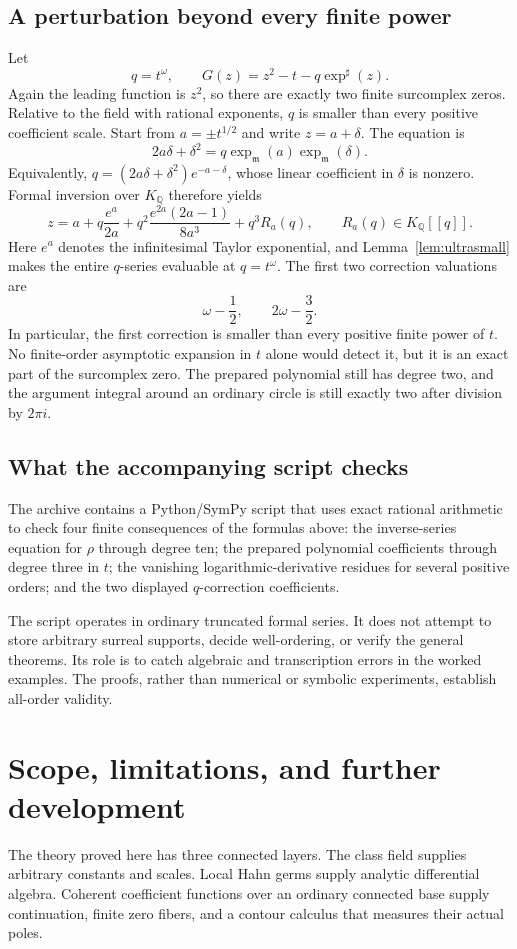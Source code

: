 \documentclass[11pt,a4paper]{article}
\theoremstyle{definition}
\theoremstyle{remark}
\newcommand{\Q}{\mathbb Q}
\newcommand{\mm}{\mathfrak m}
\begin{document}
\subsection{A perturbation beyond every finite power}
Let
\[
 q=t^\omega,\qquad G(z)=z^2-t-q\exp^\sharp(z).
\]
Again the leading function is $z^2$, so there are exactly two finite
surcomplex zeros. Relative to the field with rational exponents,
$q$ is smaller than every positive coefficient scale. Start from
$a=\pm t^{1/2}$ and write $z=a+\delta$. The equation is
\[
 2a\delta+\delta^2=q\exp_{\mm}(a)\exp_{\mm}(\delta).
\]
Equivalently, $q=(2a\delta+\delta^2)e^{-a-\delta}$, whose
linear coefficient in $\delta$ is nonzero. Formal inversion over
$K_\Q$ therefore yields
\begin{equation}\label{eq:twoscale}
 z=a+q\frac{e^a}{2a}
       +q^2\frac{e^{2a}(2a-1)}{8a^3}+q^3R_a(q),
 \qquad R_a(q)\in K_\Q[[q]].
\end{equation}
Here $e^a$ denotes the infinitesimal Taylor exponential, and
Lemma~\ref{lem:ultrasmall} makes the entire $q$-series evaluable at
$q=t^\omega$. The first two correction valuations are
\[
 \omega-\frac12,\qquad 2\omega-\frac32.
\]
In particular, the first correction is smaller than every positive
finite power of $t$. No finite-order asymptotic expansion in $t$
alone would detect it, but it is an exact part of the surcomplex zero.
The prepared polynomial still has degree two, and the argument
integral around an ordinary circle is still exactly two after division
by $2\pi i$.

\subsection{What the accompanying script checks}
The archive contains a Python/SymPy script that uses exact rational
arithmetic to check four finite consequences of the formulas above:
the inverse-series equation for $\rho$ through degree ten; the
prepared polynomial coefficients through degree three in $t$; the
vanishing logarithmic-derivative residues for several positive
orders; and the two displayed $q$-correction coefficients.

The script operates in ordinary truncated formal series. It does not
attempt to store arbitrary surreal supports, decide well-ordering,
or verify the general theorems. Its role is to catch algebraic and
transcription errors in the worked examples. The proofs, rather than
numerical or symbolic experiments, establish all-order validity.

\section{Scope, limitations, and further development}\label{sec:scope}
The theory proved here has three connected layers. The class field
supplies arbitrary constants and scales. Local Hahn germs supply
analytic differential algebra. Coherent coefficient functions over an
ordinary connected base supply continuation, finite zero fibers,
and a contour calculus that measures their actual poles.
\end{document}
